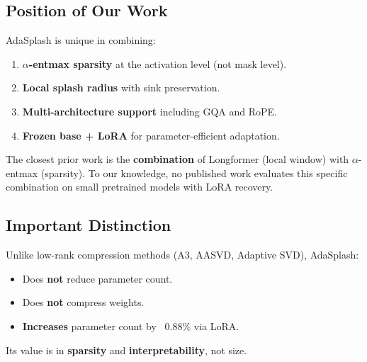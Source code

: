\subsection{Position of Our Work}

AdaSplash is unique in combining:
\begin{enumerate}
\item \textbf{$\alpha$-entmax sparsity} at the activation level (not mask level).
\item \textbf{Local splash radius} with sink preservation.
\item \textbf{Multi-architecture support} including GQA and RoPE.
\item \textbf{Frozen base + LoRA} for parameter-efficient adaptation.

\end{enumerate}
The closest prior work is the \textbf{combination} of Longformer (local window) 
with $\alpha$-entmax (sparsity). To our knowledge, no published work evaluates this 
specific combination on small pretrained models with LoRA recovery.

\subsection{Important Distinction}

Unlike low-rank compression methods (A3, AASVD, Adaptive SVD), AdaSplash:
\begin{itemize}
\item Does \textbf{not} reduce parameter count.
\item Does \textbf{not} compress weights.
\item \textbf{Increases} parameter count by ~0.88\% via LoRA.

\end{itemize}
Its value is in \textbf{sparsity} and \textbf{interpretability}, not size.